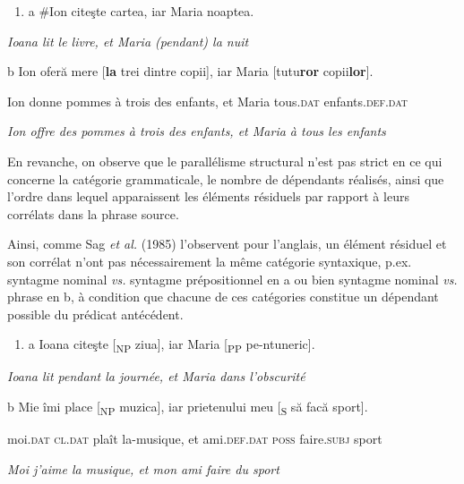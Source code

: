 \begin{enumerate}
\item \label{bkm:Ref289428025}a  \#Ion citeşte cartea, iar Maria noaptea.


\end{enumerate}
{\itshape
Ioana lit le livre, et Maria (pendant) la nuit} 

  b  Ion oferă mere [\textbf{la} trei dintre copii], iar Maria [tutu\textbf{ror} copii\textbf{lor}].

    Ion donne pommes à trois des enfants, et Maria tous.\textsc{dat} enfants.\textsc{def.dat} 

    \textit{Ion offre des pommes à trois des enfants, et Maria à tous les enfants} 

En revanche, on observe que le parallélisme structural n'est pas strict en ce qui concerne la catégorie grammaticale, le nombre de dépendants réalisés, ainsi que l'ordre dans lequel apparaissent les éléments résiduels par rapport à leurs corrélats dans la phrase source. 

Ainsi, comme Sag \textit{et al.} (1985) l'observent pour l'anglais, un élément résiduel et son corrélat n'ont pas nécessairement la même catégorie syntaxique, p.ex. syntagme nominal \textit{vs.} syntagme prépositionnel en a ou bien syntagme nominal \textit{vs.} phrase en b, à condition que chacune de ces catégories constitue un dépendant possible du prédicat antécédent.


\begin{enumerate}
\item \label{bkm:Ref289380971}a  Ioana citeşte [\textsubscript{NP} ziua], iar Maria [\textsubscript{PP} pe-ntuneric].


\end{enumerate}
{\itshape
Ioana lit pendant la journée, et Maria dans l'obscurité} 

  b  Mie îmi place [\textsubscript{NP} muzica], iar prietenului meu [\textsubscript{S} să facă sport].

    moi.\textsc{dat cl.dat} plaît la-musique, et ami.\textsc{def.dat} \textsc{poss} faire\textsc{.subj} sport 

    \textit{Moi j'aime la musique, et mon ami faire du sport} 


